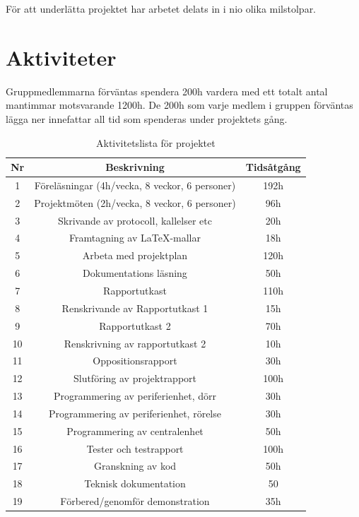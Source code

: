 \documentclass[a4paper]{article}
\begin{document}
För att underlätta projektet har arbetet delats in i nio olika milstolpar.

\section{Aktiviteter}

Gruppmedlemmarna förväntas spendera 200h vardera med ett totalt antal mantimmar motsvarande 1200h. De 200h som varje medlem i gruppen förväntas lägga ner innefattar all tid som spenderas under projektets gång.


\begin{table}[H]
    \begin{center}
        \begin{tabular}{ |c|c|c| }\hline
            Nr & Beskrivning & Tidsåtgång \\\hline\hline
            1 & Föreläsningar (4h/vecka, 8 veckor, 6 personer) & 192h \\\hline
            2 & Projektmöten (2h/vecka, 8 veckor, 6 personer) & 96h \\\hline
            3 & Skrivande av protocoll, kallelser etc & 20h \\\hline
            4 & Framtagning av LaTeX-mallar & 18h \\\hline
            5 & Arbeta med projektplan & 120h \\\hline
            6 & Dokumentations läsning & 50h \\\hline
            7 & Rapportutkast & 110h \\\hline
            8 & Renskrivande av Rapportutkast 1 & 15h \\\hline
            9 & Rapportutkast 2 & 70h\\\hline
            10 & Renskrivning av rapportutkast 2 & 10h \\\hline
            11 & Oppositionsrapport & 30h\\\hline
            12 & Slutföring av projektrapport & 100h\\\hline
            13 & Programmering av periferienhet, dörr & 30h \\\hline
            14 & Programmering av periferienhet, rörelse & 30h \\\hline
            15 & Programmering av centralenhet & 50h \\\hline
            16 & Tester och testrapport & 100h\\\hline
            17 & Granskning av kod & 50h \\\hline
            18 & Teknisk dokumentation & 50 \\\hline
            19 & Förbered/genomför demonstration & 35h \\\hline
        \end{tabular}
        \caption{Aktivitetslista för projektet}
        \label{table:aktivitetslista}
    \end{center}
\end{table}
\end{document}
